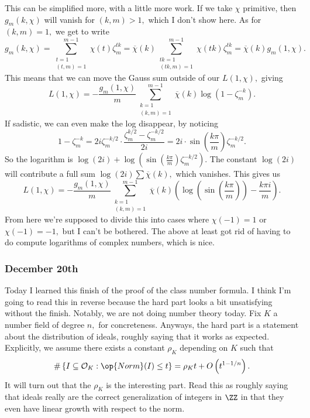 This can be simplified more, with a little more work. If we take $\chi$ primitive, then $g_m(k,\chi)$ will vanish for $(k,m)>1,$ which I don't show here. As for $(k,m)=1,$ we get to write
\[g_m(k,\chi)=\sum_{\substack{t=1\\(t,m)=1}}^{m-1}\chi(t)\zeta_m^{tk}=\overline\chi(k)\sum_{\substack{tk=1\\(tk,m)=1}}^{m-1}\chi(tk)\zeta_m^{tk}=\overline\chi(k)g_m(1,\chi).\]
This means that we can move the Gauss sum outside of our $L(1,\chi),$ giving
\[L(1,\chi)=-\frac{g_m(1,\chi)}m\sum_{\substack{k=1\\(k,m)=1}}^{m-1}\overline\chi(k)\log\left(1-\zeta_m^{-k}\right).\]
If sadistic, we can even make the log disappear, by noticing
\[1-\zeta_m^{-k}=2i\zeta_m^{-k/2}\cdot\frac{\zeta_m^{k/2}-\zeta_m^{-k/2}}{2i}=2i\cdot\sin\left(\frac{k\pi}m\right)\zeta_m^{-k/2}.\]
So the logarithm is $\log(2i)+\log\left(\sin\left(\frac{k\pi}m\right)\zeta_m^{-k/2}\right).$ The constant $\log(2i)$ will contribute a full sum $\log(2i)\sum\overline\chi(k),$ which vanishes. This gives us
\[L(1,\chi)=-\frac{g_m(1,\chi)}m\sum_{\substack{k=1\\(k,m)=1}}^{m-1}\overline\chi(k)\left(\log\left(\sin\left(\frac{k\pi}m\right)\right)-\frac{k\pi i}m\right).\]
From here we're supposed to divide this into cases where $\chi(-1)=1$ or $\chi(-1)=-1,$ but I can't be bothered. The above at least got rid of having to do compute logarithms of complex numbers, which is nice.

\subsubsection{December 20th}
Today I learned this finish of the proof of the class number formula. I think I'm going to read this in reverse because the hard part looks a bit unsatisfying without the finish. Notably, we are not doing number theory today. Fix $K$ a number field of degree $n,$ for concreteness. Anyways, the hard part is a statement about the distribution of ideals, roughly saying that it works as expected. Explicitly, we assume there exists a constant $\rho_K$ depending on $K$ such that
\[\#\left\{I\subseteq\mathcal O_K:\op{Norm}(I)\le t\right\}=\rho_Kt+O\left(t^{1-1/n}\right).\]
It will turn out that the $\rho_K$ is the interesting part. Read this as roughly saying that ideals really are the correct generalization of integers in $\ZZ$ in that they even have linear growth with respect to the norm.

